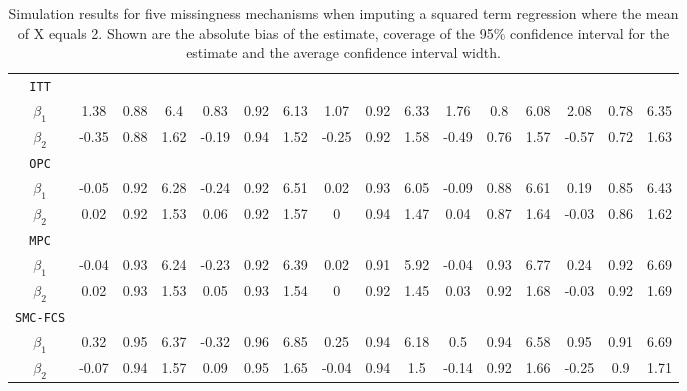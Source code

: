 \begin{table}[ht!]
{\begin{tabular}{c|ccc|ccc|ccc|ccc|ccc}
				\texttt{ITT}            &        &        &        &        &        &        &        &        &        &        &        &        &        &        &        \\
				$\beta_1$      & 1.38  & 0.88  & 6.4  & 0.83  & 0.92  & 6.13  & 1.07  & 0.92   & 6.33  & 1.76  & 0.8  & 6.08  & 2.08  & 0.78  & 6.35  \\
				$\beta_2$      & -0.35  & 0.88  & 1.62  & -0.19  & 0.94  & 1.52  & -0.25  & 0.92  & 1.58  & -0.49  & 0.76  & 1.57  & -0.57  & 0.72  & 1.63  \\	
				\texttt{OPC}     &         &        &        &         &        &        &         &        &        &         &        &        &         &        &        \\
				$\beta_1$                         & -0.05  & 0.92  & 6.28  & -0.24   & 0.92  & 6.51  & 0.02   & 0.93  & 6.05  & -0.09   & 0.88  & 6.61  & 0.19    & 0.85  & 6.43  \\
				$\beta_2$                         & 0.02    & 0.92   & 1.53  & 0.06   & 0.92  & 1.57  & 0   & 0.94  & 1.47   & 0.04   & 0.87  & 1.64  & -0.03   & 0.86  & 1.62  \\
				\texttt{MPC}     &         &        &        &         &        &        &         &        &        &         &        &        &         &        &        \\
				$\beta_1$                         & -0.04   & 0.93  & 6.24  & -0.23   & 0.92   & 6.39  & 0.02  & 0.91  & 5.92  & -0.04  & 0.93  & 6.77  & 0.24   & 0.92  & 6.69   \\
				$\beta_2$                         & 0.02   & 0.93  & 1.53  & 0.05    & 0.93  & 1.54  & 0   & 0.92   & 1.45  & 0.03   & 0.92   & 1.68  & -0.03   & 0.92   & 1.69  \\
				\texttt{SMC-FCS} &         &        &        &         &        &        &         &        &        &         &        &        &         &        &        \\
				$\beta_1$                         & 0.32   & 0.95  & 6.37  &-0.32   & 0.96  & 6.85   & 0.25   & 0.94  & 6.18  & 0.5   & 0.94  & 6.58  & 0.95   & 0.91  & 6.69  \\
				$\beta_2$                         & -0.07   & 0.94  & 1.57  & 0.09   & 0.95   & 1.65  & -0.04   & 0.94  & 1.5  & -0.14   & 0.92   & 1.66  & -0.25   & 0.9  & 1.71 
			\end{tabular}
		}
		\caption{Simulation results for five missingness mechanisms when imputing a squared term regression where the mean of X equals 2. Shown are the absolute bias of the estimate, coverage of the 95\% confidence interval for the estimate and the average confidence interval width.}
		\label{tab2_4}
	\end{table}


